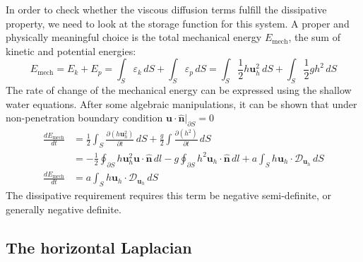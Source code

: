 In order to check whether the viscous diffusion terms fulfill the dissipative property, we need to look at the storage function for this system. A proper and physically meaningful choice is the total mechanical energy $E_\mathrm{mech}$, the sum of kinetic and potential energies:
\[
    E_\mathrm{mech} = E_k + E_p = \int_S \varepsilon_k \, dS + \int_S \varepsilon_p \, dS = \int_S \frac{1}{2} h \mathbf{u}_h^2 \, dS + \int_S \frac{1}{2} gh^2 \, dS
\]
The rate of change of the mechanical energy can be expressed using the shallow water equations. After some algebraic manipulations, it can be shown that under non-penetration boundary condition $\mathbf{u}\cdot \hat{\mathbf{n}}|_{\partial S} = 0 $
\begin{equation}\label{eqn:SWE-diff-integral}
\begin{aligned}
    \frac{dE_\mathrm{mech}}{dt} &= \frac{1}{2} \int_S \frac{\partial (h \mathbf{u}_h^2)}{\partial t} \, dS + \frac{g}{2} \int \frac{\partial (h^2)}{\partial t}\, dS \\ 
    &= - \frac{1}{2} \oint_{\partial S} h \mathbf{u}_h^2 \mathbf{u}\cdot \hat{\mathbf{n}} \, dl - g \oint_{\partial S} h^2 \mathbf{u}_h \cdot \hat{\mathbf{n}} \, dl + a \int_S h \mathbf{u}_h \cdot \mathcal{D}_{\mathbf{u}_h} \, dS \\
    \frac{dE_\mathrm{mech}}{dt} &= a \int_S h \mathbf{u}_h \cdot \mathcal{D}_{\mathbf{u}_h} \, dS
\end{aligned}
\end{equation}
The dissipative requirement requires this term be negative semi-definite, or generally negative definite.

\subsection{The horizontal Laplacian}

